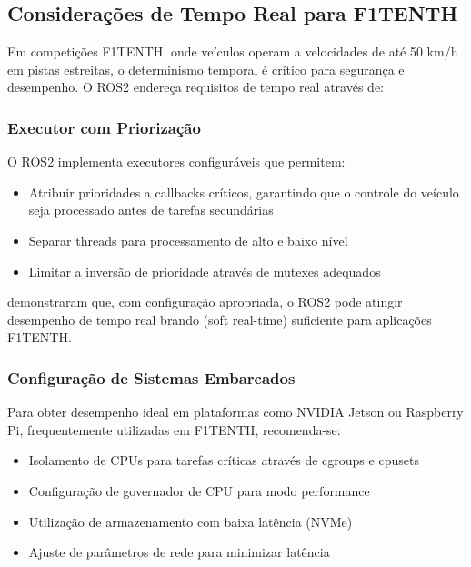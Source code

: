 \subsection{Considerações de Tempo Real para F1TENTH}

Em competições F1TENTH, onde veículos operam a velocidades de até 50 km/h em
pistas estreitas, o determinismo temporal é crítico para segurança e
desempenho. O ROS2 endereça requisitos de tempo real através de:

\subsubsection{Executor com Priorização}

O ROS2 implementa executores configuráveis que permitem:

\begin{itemize}
    \item Atribuir prioridades a callbacks críticos, garantindo que o controle do veículo
          seja processado antes de tarefas secundárias
    \item Separar threads para processamento de alto e baixo nível
    \item Limitar a inversão de prioridade através de mutexes adequados
\end{itemize}

\cite{casini2019response} demonstraram que, com configuração apropriada, o ROS2 pode atingir desempenho de tempo real brando (soft real-time) suficiente para aplicações F1TENTH.

\subsubsection{Configuração de Sistemas Embarcados}

Para obter desempenho ideal em plataformas como NVIDIA Jetson ou Raspberry Pi,
frequentemente utilizadas em F1TENTH, recomenda-se:

\begin{itemize}
    \item Isolamento de CPUs para tarefas críticas através de cgroups e cpusets
    \item Configuração de governador de CPU para modo performance
    \item Utilização de armazenamento com baixa latência (NVMe)
    \item Ajuste de parâmetros de rede para minimizar latência
\end{itemize}

